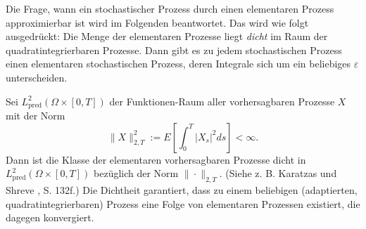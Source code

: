 \begin{satz}
Die Frage, wann ein stochastischer Prozess durch einen elementaren Prozess approximierbar ist wird im Folgenden 
beantwortet. Das wird wie folgt ausgedrückt: Die Menge der elementaren Prozesse liegt \textit{dicht} im Raum
der quadratintegrierbaren Prozesse. Dann gibt es zu jedem stochastischen Prozess einen elementaren stochastischen
Prozess, deren Integrale sich um ein beliebiges $\varepsilon$ unterscheiden.

Sei $L^2_{\mathrm{pred}}(\Omega\times[0,T])$ der Funktionen-Raum aller vorhersagbaren Prozesse $X$ mit der Norm
$$\|X\|_{2,T}^2 := E \left [ \int_0^T |X_s|^2 ds \right ] < \infty.$$
Dann ist die Klasse der elementaren vorhersagbaren Prozesse dicht 
in $L^2_{\mathrm{pred}}(\Omega\times[0,T])$ bezüglich der Norm $\|\cdot\|_{2,T}$. (Siehe z. B. Karatzas und Shreve \cite{karatzas_brownian_1991}, S. 132f.) 
Die Dichtheit garantiert, dass zu einem beliebigen (adaptierten, quadratintegrierbaren) Prozess 
eine Folge von elementaren Prozessen existiert, die dagegen konvergiert.
\end{satz}

